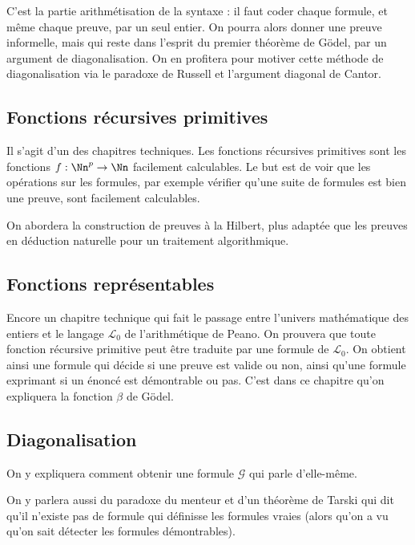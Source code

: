 \documentclass[11pt,class=report,crop=false]{standalone}
\begin{document}
C'est la partie \og{}arithmétisation de la syntaxe\fg{} : il faut coder chaque formule, et même chaque preuve, par un seul entier. On pourra alors donner une preuve informelle, mais qui reste dans l'esprit du premier théorème de Gödel, par un argument de diagonalisation. On en profitera pour motiver cette méthode de diagonalisation via le paradoxe de Russell et l'argument diagonal de Cantor.


\subsection{Fonctions récursives primitives}

Il s'agit d'un des chapitres techniques. Les fonctions récursives primitives sont les fonctions $f : \Nn^p \to \Nn$ \og{}facilement calculables\fg{}. Le but est de voir que les opérations sur les formules, par exemple vérifier qu'une suite de formules est bien une preuve, sont facilement calculables.

On abordera la construction de preuves à la Hilbert, plus adaptée que les preuves en déduction naturelle pour un traitement algorithmique.



\subsection{Fonctions représentables}

Encore un chapitre technique qui fait le passage entre l'univers mathématique des entiers et le langage $\mathcal{L}_0$ de l'arithmétique de Peano. 
On prouvera que toute fonction récursive primitive peut être traduite par une formule de $\mathcal{L}_0$. 
On obtient ainsi une formule qui décide si une preuve est valide ou non, ainsi qu'une formule exprimant si un énoncé est démontrable ou pas.
C'est dans ce chapitre qu'on expliquera la fonction $\beta$ de Gödel.


\subsection{Diagonalisation}

On y expliquera comment obtenir une formule $\mathcal{G}$ qui parle d'elle-même.

On y parlera aussi du paradoxe du menteur et d'un théorème de Tarski qui dit qu'il n'existe pas de formule qui définisse les formules vraies (alors qu'on a vu qu'on sait détecter les formules démontrables).
\end{document}
